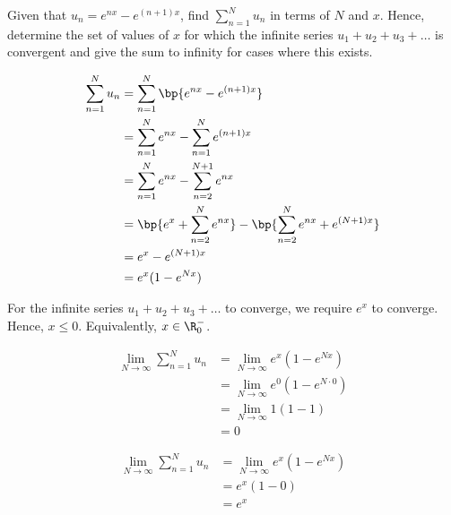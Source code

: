 \documentclass{echw}
\begin{document}
    \problem{}
        Given that $u_n = e^{nx} - e^{(n+1)x}$, find $\displaystyle\sum\limits_{n=1}^N u_n$ in terms of $N$ and $x$. Hence, determine the set of values of $x$ for which the infinite series $u_1 + u_2 + u_3 + \ldots$ is convergent and give the sum to infinity for cases where this exists.

    \solution
        \begin{align*}
            \sum\limits_{n=1}^N u_n &= \sum\limits_{n=1}^N \bp{e^{nx} - e^{(n+1)x}}\\
            &= \sum_{n=1}^N e^{nx} - \sum_{n=1}^N e^{(n+1)x}\\
            &= \sum_{n=1}^N e^{nx} - \sum_{n=2}^{N+1} e^{nx}\\
            &= \bp{e^x + \sum_{n=2}^N e^{nx}} - \bp{\sum_{n=2}^{N} e^{nx} + e^{(N+1)x}}\\
            &= e^x - e^{(N+1)x}\\
            &= e^x(1 - e^{Nx})
        \end{align*}


        For the infinite series $u_1 + u_2 + u_3 + \ldots$ to converge, we require $e^x$ to converge. Hence, $x \leq 0$. Equivalently, $x \in \R^-_0$.


        \begin{align*}
            \lim_{N \to \infty} \sum\limits_{n=1}^N u_n &= \lim_{N \to \infty} e^x(1 - e^{Nx}) \\
            &= \lim_{N \to \infty} e^0(1 - e^{N\cdot0}) \\
            &= \lim_{N \to \infty} 1(1 - 1) \\
            &= 0
        \end{align*}


        \begin{align*}
            \lim_{N \to \infty} \sum\limits_{n=1}^N u_n &= \lim_{N \to \infty} e^x(1 - e^{Nx}) \\
            &= e^x(1 - 0)\\
            &= e^x
        \end{align*}

\end{document}
